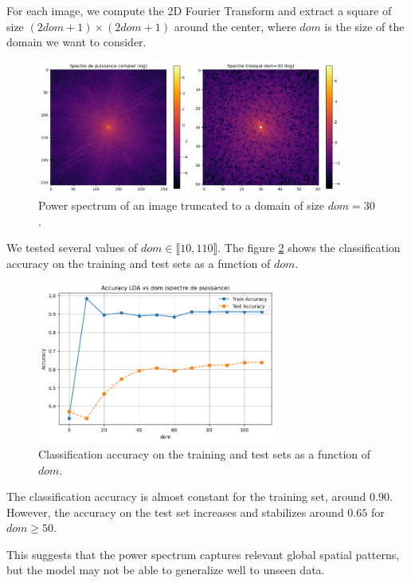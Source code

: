 \documentclass[12pt,a4paper]{article}
\begin{document}
For each image, we compute the 2D Fourier Transform and extract a square of size $(2 dom + 1) \times (2 dom + 1)$ around the center, where $dom$ is the size of the domain we want to consider.
\begin{figure}[H]
    \centering
    \includegraphics[width=0.9\textwidth]{src/power_spectrum.png}
    \caption{Power spectrum of an image truncated to a domain of size $dom = 30$.}
    \label{fig:power_spectrum}
\end{figure}

We tested several values of $dom \in \llbracket 10, 110 \rrbracket$.
The figure \ref{fig:accuracy_dom} shows the classification accuracy on the training and test sets as a function of $dom$.
\begin{figure}[H]
    \centering
    \includegraphics[width=0.7\textwidth]{src/accuracy_dom.png}
    \caption{Classification accuracy on the training and test sets as a function of $dom$.}
    \label{fig:accuracy_dom}
\end{figure}

The classification accuracy is almost constant for the training set, around $0.90$.
However, the accuracy on the test set increases and stabilizes around $0.65$ for $dom \geq 50$.

This suggests that the power spectrum captures relevant global spatial patterns, but the model may not be able to generalize well to unseen data.
\end{document}
